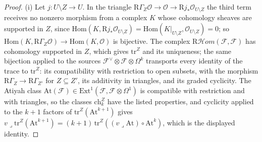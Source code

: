\documentclass[11pt,reqno]{amsart}
\numberwithin{equation}{section}
\theoremstyle{plain}
\theoremstyle{definition}
\newcommand{\Ext}{\mathrm{Ext}}
\newcommand{\Hom}{\mathrm{Hom}}
\newcommand{\ch}{\mathrm{ch}}
\begin{document}
\begin{proof}
(i) Let $j\colon U\setminus Z\to U$. In the triangle $\mathrm{R}\Gamma_{Z}\mathcal{O}\to\mathcal{O}\to\mathrm{R}j_{*}\mathcal{O}_{U\setminus Z}$ the third term receives no nonzero morphism from a complex $K$ whose cohomology sheaves are supported in $Z$, since $\Hom(K,\mathrm{R}j_{*}\mathcal{O}_{U\setminus Z})=\Hom(K|_{U\setminus Z},\mathcal{O}_{U\setminus Z})=0$; so $\Hom(K,\mathrm{R}\Gamma_{Z}\mathcal{O})\to\Hom(K,\mathcal{O})$ is bijective. The complex $\mathrm{R}\mathcal{H}om(\mathcal{F},\mathcal{F})$ has cohomology supported in $Z$, which gives $\mathrm{tr}^{Z}$ and its uniqueness; the same bijection applied to the sources $\mathcal{F}^{\vee}\otimes\mathcal{F}\otimes\Omega^{k}$ transports every identity of the trace to $\mathrm{tr}^{Z}$: its compatibility with restriction to open subsets, with the morphism $\mathrm{R}\Gamma_{Z}\to\mathrm{R}\Gamma_{Z'}$ for $Z\subseteq Z'$, its additivity in triangles, and its graded cyclicity. The Atiyah class $\mathrm{At}(\mathcal{F})\in\Ext^{1}(\mathcal{F},\mathcal{F}\otimes\Omega^{1})$ is compatible with restriction and with triangles, so the classes $\ch^{Z}_{k}$ have the listed properties, and cyclicity applied to the $k+1$ factors of $\mathrm{tr}^{Z}(\mathrm{At}^{k+1})$ gives $v\lrcorner\mathrm{tr}^{Z}(\mathrm{At}^{k+1})=(k+1)\,\mathrm{tr}^{Z}((v\lrcorner\mathrm{At})\circ\mathrm{At}^{k})$, which is the displayed identity.


\end{proof}
\end{document}
